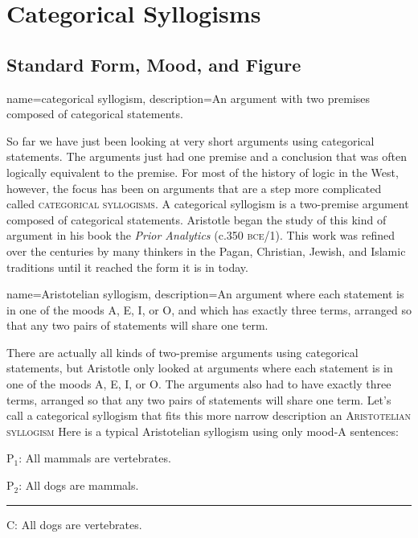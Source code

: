 \chapter{Categorical Syllogisms}
\label{chap:cat_syllogisms}
\setlength{\parindent}{1em}


\section{Standard Form, Mood, and Figure}
\label{sec:form_mood_figure}
{
name=categorical syllogism,
description={An argument with two premises composed of categorical statements.}
}


So far we have just been looking at very short arguments using categorical statements. The arguments just had one premise and a conclusion that was often logically equivalent to the premise. For most of the history of logic in the West, however, the focus has been on arguments that are a step more complicated called \textsc{\glspl{categorical syllogism}}. A categorical syllogism is a two-premise argument composed of categorical statements. Aristotle began the study of this kind of argument in his book the \textit{Prior Analytics} (c.350 \textsc{bce}/1\citeyear{Aristotle1984b}). This work was refined over the centuries by many thinkers in the Pagan, Christian, Jewish, and Islamic traditions until it reached the form it is in today.

{
name=Aristotelian syllogism,
description={An argument where each statement is in one of the moods A, E, I, or O, and which has exactly three terms, arranged so that any two pairs of statements will share one term.}
}


There are actually all kinds of two-premise arguments using categorical statements, but Aristotle only looked at arguments where each statement is in one of the moods A, E, I, or O. The arguments also had to have exactly three terms, arranged so that any two pairs of statements will share one term. Let's call a categorical syllogism that fits this more narrow description an \textsc{\gls{Aristotelian syllogism}} Here is a typical Aristotelian syllogism using only mood-A sentences:

\begin{earg}
\item[P$_1$:] All mammals are vertebrates.
\item[P$_2$:] All dogs are mammals.
\vspace{-.5em}
\item [] \rule{0.3\linewidth}{.5pt} 
\item[C:] All dogs are vertebrates. 
\end{earg} 
\label{AAA_arg}


